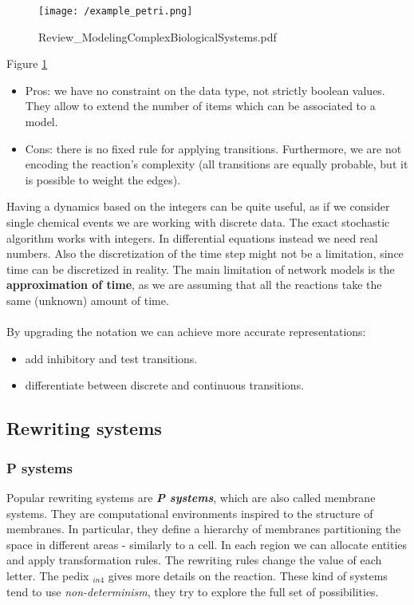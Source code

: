   \begin{figure}
    \centering
    \texttt{[image: /example\_petri.png]}
    \caption{Review\_ModelingComplexBiologicalSystems.pdf}
    \label{fig:expetri}
  \end{figure}

\noindent
  Figure \ref{fig:expetri}
  \begin{itemize}
  \item Pros: we have no constraint on the data type, not strictly boolean values. They allow to extend the number of items which can be associated to a model.
  \item Cons: there is no fixed rule for applying transitions. Furthermore, we are not encoding the reaction's complexity (all transitions are equally probable, but it is possible to weight the edges).
  \end{itemize}
  
  \noindent
  Having a dynamics based on the integers can be quite useful, as if we consider single chemical events we are working with discrete data.
  The exact stochastic algorithm works with integers.
  In differential equations instead we need real numbers.
  Also the discretization of the time step might not be a limitation, since time can be discretized in reality.
  The main limitation of network models is the \textbf{approximation of time},  as we are assuming that all the reactions take the same (unknown) amount of time.
  \\
  \\
  \noindent
 By upgrading the notation we can achieve more accurate representations:
  \begin{itemize}
    \item add inhibitory and test transitions.
    \item differentiate between discrete and continuous transitions.
  \end{itemize}

  \subsection{Rewriting systems}

    \subsubsection{P systems}
    Popular rewriting systems are \textbf{\emph{P systems}}, which are also called membrane systems.
    They are computational environments inspired to the structure of membranes.
    In particular, they define a hierarchy of membranes partitioning the space in different areas - similarly to a cell.
    In each region we can allocate entities and apply transformation rules.
    The rewriting rules change the value of each letter.
    The pedix \(_{in4}\) gives more details on the reaction.
    These kind of systems tend to use \emph{non-determinism}, they try to explore the full set of possibilities.

